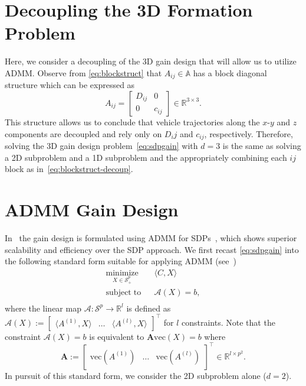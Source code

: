 \documentclass[a4paper]{article}
\begin{document}
\section*{Decoupling the 3D Formation Problem}
Here, we consider a decoupling of the 3D gain design that will allow us to utilize ADMM.
Observe from \eqref{eq:blockstruct} that $A_{ij}\in\mathbb{A}$ has a block diagonal structure which can be expressed as
\begin{equation}\label{eq:blockstruct-decoup}
A_{ij} = \begin{bmatrix}D_{ij} & 0 \\ 0 & c_{ij}\end{bmatrix} \in\mathbb{R}^{3\times 3}.
\end{equation}
This structure allows us to conclude that vehicle trajectories along the $x$-$y$ and $z$ components are decoupled and rely only on $D_ij$ and $c_{ij}$, respectively.
Therefore, solving the 3D gain design problem~\eqref{eq:sdpgain} with $d=3$ is the same as solving a 2D subproblem and a 1D subproblem and the appropriately combining each $ij$ block as in~\eqref{eq:blockstruct-decoup}.

\section*{ADMM Gain Design}
In~\cite{Lusk2020formation} the gain design is formulated using ADMM for SDPs~\cite{Wen2010}, which shows superior scalability and efficiency over the SDP approach.
We first recast \eqref{eq:sdpgain} into the following standard form suitable for applying ADMM (see~\cite{Wen2010})
\begin{equation} \label{eq:sdpstandard}
\begin{aligned}
& \underset{X\in\mathcal{S}^p_+}{\mathrm{minimize}}
& & \langle C,X\rangle & \\
& \mathrm{subject\; to}
& & \mathcal{A}(X) = b, & \\
\end{aligned}
\end{equation}
where the linear map $\mathcal{A}:\mathcal{S}^p\to\mathbb{R}^l$ is defined as $\mathcal{A}(X):=\begin{bmatrix}\langle A^{(1)}, X\rangle&\dots&\langle A^{(l)}, X\rangle\end{bmatrix}^\top$ for $l$ constraints.
Note that the constraint $\mathcal{A}(X)=b$ is equivalent to $\mathbf{A}\mathrm{vec}(X)=b$ where
\begin{equation}
\mathbf{A}:=
\begin{bmatrix}\mathrm{vec}\left(A^{(1)}\right)&\dots&\mathrm{vec}\left(A^{(l)}\right)\end{bmatrix}^\top\in\mathbb{R}^{l\times p^2}.
\end{equation}
In pursuit of this standard form, we consider the 2D subproblem alone ($d=2$).
\end{document}
